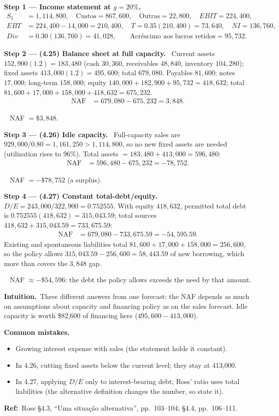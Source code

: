 \documentclass[11pt,a4paper]{article}
\newcommand{\step}[2]{\par\medskip\noindent\textbf{Step #1 --- #2.}~}
\newcommand{\intuition}{\par\medskip\noindent\textbf{Intuition.}~}
\newcommand{\refbib}{\par\smallskip\noindent\textbf{Ref:}~}
\newcommand{\answer}[1]{\par\smallskip\noindent\fbox{\textbf{Answer #1.}}~}
\newcommand{\pitfalls}{\par\medskip\noindent\textbf{Common mistakes.}}
\begin{document}
\step{1}{Income statement at $g=20\%$}
\begin{align}
  S_1 &= 1{,}114{,}800, \quad \text{Custos} = 867{,}600, \quad \text{Outras} = 22{,}800, \quad EBIT = 224{,}400, \nonumber\\
  EBT &= 224{,}400-14{,}000 = 210{,}400, \quad T = 0.35(210{,}400) = 73{,}640, \quad NI = 136{,}760, \nonumber\\
  Div &= 0.30(136{,}760) = 41{,}028, \qquad \text{Acr\'escimo aos lucros retidos} = 95{,}732. \label{r2ce11-is}
\end{align}

\step{2}{(4.25) Balance sheet at full capacity} Current assets $152{,}900(1.2)=183{,}480$
(cash $30{,}360$, receivables $48{,}840$, inventory $104{,}280$); fixed assets $413{,}000(1.2)=495{,}600$;
total $679{,}080$. Payables $81{,}600$; notes $17{,}000$; long-term $158{,}000$; equity
$140{,}000+182{,}900+95{,}732=418{,}632$; total $81{,}600+17{,}000+158{,}000+418{,}632=675{,}232$.
\begin{align}
  \text{NAF} &= 679{,}080-675{,}232 = 3{,}848. \label{r2ce11-25}
\end{align}
\answer{(4.25)} NAF $=\$3{,}848$.

\step{3}{(4.26) Idle capacity} Full-capacity sales are $929{,}000/0.80=1{,}161{,}250>1{,}114{,}800$, so no new
fixed assets are needed (utilization rises to 96\%). Total assets $=183{,}480+413{,}000=596{,}480$:
\begin{align}
  \text{NAF} &= 596{,}480-675{,}232 = -78{,}752. \label{r2ce11-26}
\end{align}
\answer{(4.26)} NAF $=-\$78{,}752$ (a surplus).

\step{4}{(4.27) Constant total-debt/equity} $D/E=243{,}000/322{,}900=0.752555$. With equity
$418{,}632$, permitted total debt is $0.752555(418{,}632)=315{,}043.59$; total sources
$418{,}632+315{,}043.59=733{,}675.59$:
\begin{align}
  \text{NAF} &= 679{,}080-733{,}675.59 = -54{,}595.59. \label{r2ce11-27}
\end{align}
Existing and spontaneous liabilities total $81{,}600+17{,}000+158{,}000=256{,}600$, so the policy allows
$315{,}043.59-256{,}600=58{,}443.59$ of new borrowing, which more than covers the $3{,}848$ gap.
\answer{(4.27)} NAF $\approx-\$54{,}596$: the debt the policy allows exceeds the need by that amount.

\intuition Three different answers from one forecast: the NAF depends as much on assumptions about
capacity and financing policy as on the sales forecast. Idle capacity is worth \$82,600 of financing here
($495{,}600-413{,}000$).
\pitfalls
\begin{itemize}
  \item Growing interest expense with sales (the statement holds it constant).
  \item In 4.26, cutting fixed assets below the current level; they stay at 413,000.
  \item In 4.27, applying $D/E$ only to interest-bearing debt; Ross' ratio uses total liabilities (the
        alternative definition changes the number, so state it).
\end{itemize}
\refbib{Ross \S4.3, ``Uma situa\c{c}\~ao alternativa'', pp.~103--104; \S4.4, pp.~106--111.}
\end{document}
